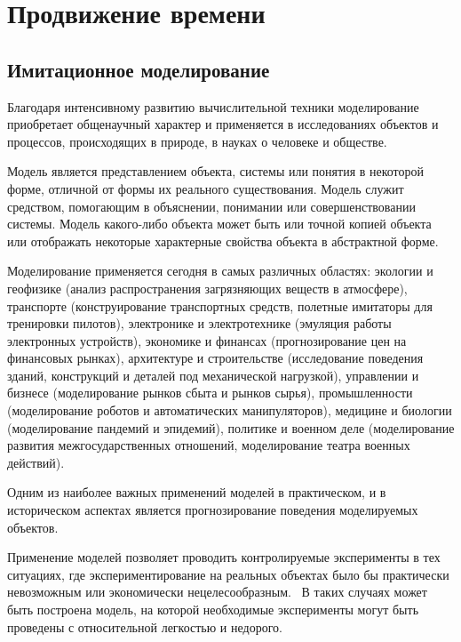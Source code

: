 \chapter{Продвижение времени} \label{chapt1}

\section{Имитационное моделирование} \label{sect1}


Благодаря интенсивному развитию вычислительной техники моделирование приобретает общенаучный характер и применяется в исследованиях объектов и процессов, происходящих в природе, в науках о человеке и обществе.

Модель является представлением объекта, системы или понятия в некоторой форме, отличной от формы их реального существования. Модель служит средством, помогающим в объяснении, понимании или совершенствовании системы. Модель какого-либо объекта может быть или точной копией объекта или отображать некоторые характерные свойства объекта в абстрактной форме.

Моделирование применяется сегодня в самых различных областях: экологии и геофизике (анализ распространения загрязняющих веществ в атмосфере), транспорте (конструирование транспортных средств, полетные имитаторы для тренировки пилотов), электронике и электротехнике (эмуляция работы электронных устройств), экономике и финансах (прогнозирование цен на финансовых рынках), архитектуре и строительстве (исследование поведения зданий, конструкций и деталей под механической нагрузкой), управлении и бизнесе (моделирование рынков сбыта и рынков сырья), промышленности (моделирование роботов и автоматических манипуляторов), медицине и биологии (моделирование пандемий и эпидемий), политике и военном деле (моделирование развития межгосударственных отношений, моделирование театра военных действий).

Одним из наиболее важных применений моделей в практическом, и в историческом аспектах является прогнозирование поведения моделируемых объектов.

Применение моделей позволяет проводить контролируемые эксперименты в тех ситуациях, где экспериментирование на реальных объектах было бы практически невозможным или экономически нецелесообразным.~\cite{Shennon} В таких случаях может быть построена модель, на которой необходимые эксперименты могут быть проведены с относительной легкостью и недорого.

